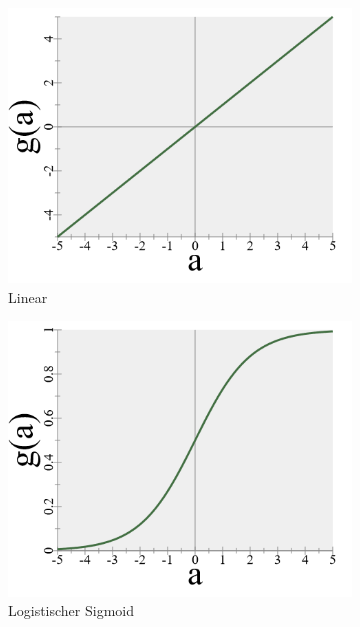 \begin{figure}
    \centering
    \begin{subfigure}[b]{0.3\textwidth}
        \includegraphics[width=\textwidth]{images/4_linear.png}
        \caption{Linear}
        \label{fig:activation_linear}
    \end{subfigure}
    \begin{subfigure}[b]{0.3\textwidth}
        \includegraphics[width=\textwidth]{images/4_sigmoid.png}
        \caption{Logistischer Sigmoid}
        \label{fig:activation_sigmoid}
    \end{subfigure}
    \begin{subfigure}[b]{0.3\textwidth}

\end{subfigure}
\end{figure}
